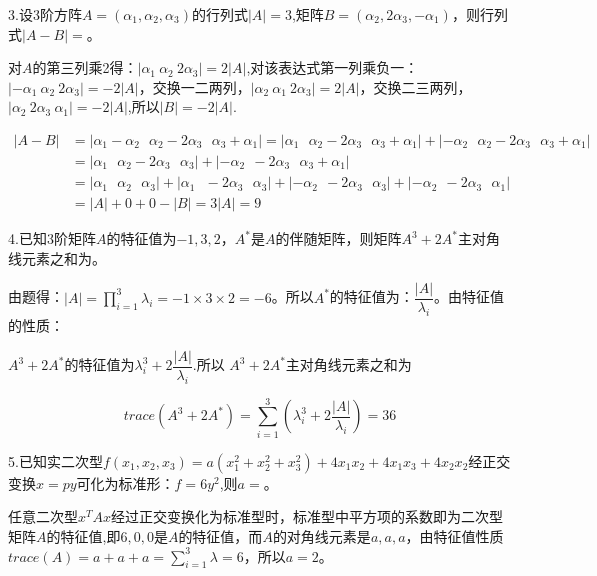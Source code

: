 \documentclass{article}
\begin{document}
3.设3阶方阵$A=(\alpha_{1},\alpha_{2},\alpha_{3})$的行列式$|A|=3$,矩阵$B=(\alpha_{2},2\alpha_{3},-\alpha_{1})$，则行列式$|A-B|=$\underline{\hphantom{~~~~~~~~~~}}。

\begin{jie}
对$A$的第三列乘2得：$|\alpha_{1}~\alpha_{2}~2\alpha_{3}|=2|A|$,对该表达式第一列乘负一：$|-\alpha_{1}~\alpha_{2}~2\alpha_{3}|=-2|A|$，交换一二两列，$|\alpha_{2}~\alpha_ {1}~2\alpha_{3}|=2|A|$，交换二三两列，$|\alpha_ {2}~2\alpha_{3}~\alpha_ {1}|=-2|A|$,所以$|B|=-2|A|$.

\begin{align*}
|A-B|&=|\alpha_{1}-\alpha_{2}~~~\alpha_{2}-2\alpha_{3}~~~\alpha_{3}+\alpha_{1}|=|\alpha_{1}~~~\alpha_{2}-2\alpha_{3}~~~\alpha_{3}+\alpha_{1}|+|-\alpha_{2}~~~\alpha_{2}-2\alpha_{3}~~~\alpha_{3}+\alpha_{1}|\\
&=\left|\alpha_{1}~~~\alpha_{2}-2\alpha_{3}~~~\alpha_{3}\right|+|-\alpha_{2}~~-2\alpha_{3}~~~\alpha_{3}+\alpha_{1}|\\
&=\left|\alpha_{1}~~~\alpha_{2}~~~\alpha_{3}\right|+\left|\alpha_{1}~~~-2\alpha_{3}~~~\alpha_{3}\right|+|-\alpha_{2}~~-2\alpha_{3}~~~\alpha_{3}|+|-\alpha_{2}~~-2\alpha_{3}~~~\alpha_{1}|\\
&=|A|+0+0-|B|=3|A|=9
\end{align*}
\end{jie}

4.已知3阶矩阵$A$的特征值为$-1,3,2$，$A^{*}$是$A$的伴随矩阵，则矩阵$A^{3}+2A^{*}$主对角线元素之和为\underline{\hphantom{~~~~~~~~~~}}。

\begin{jie}
由题得：$|A|=\prod\limits_{i=1}^3\lambda_i=-1\times3\times2=-6$。所以$A^*$的特征值为：$\dfrac{|A|}{\lambda_i}$。由特征值的性质：

$A^ {3}+2A^{*}$的特征值为$\lambda_i^3+2\dfrac{|A|}{\lambda_i}$.所以
$A^ {3}+2A^{*}$主对角线元素之和为

\begin{equation*}
trace(A^ {3}+2A^{*})=\sum_{i=1}^{3}\left(\lambda_i^3+2\dfrac{|A|}{\lambda_i}\right)=36
\end{equation*}
\end{jie}

5.已知实二次型$f(x_{1},x_{2},x_{3})=a(x_{1}^{2}+x_{2}^{2}+x_{3}^{2})+4x_{1}x_{2}+4x_{1}x_{3}+4x_{2}x_{2}$经正交变换$x=py$可化为标准形：$f=6y^{2}$,则$a=$\underline{\hphantom{~~~~~~~~~~}}。

\begin{jie}
任意二次型$x^TAx$经过正交变换化为标准型时，标准型中平方项的系数即为二次型矩阵$A$的特征值,即$6,0,0$是$A$的特征值，而$A$的对角线元素是$a,a,a$，由特征值性质$trace(A)=a+a+a=\sum_{i=1}^{3}\lambda=6$，所以$a=2$。
\end{jie}
\end{document}
